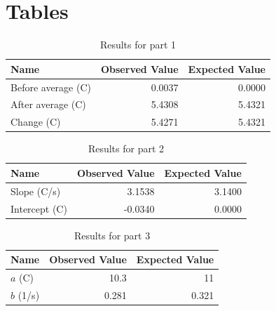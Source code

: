 \section{Tables}
\begin{table}[ht]
    \centering
    \begin{tabular}{|l|r|r|}
        \hline
        Name & Observed Value & Expected Value \\
        \hline
        Before average (C) & 0.0037 & 0.0000 \\
        After average (C) & 5.4308 & 5.4321 \\
        Change (C) & 5.4271 & 5.4321 \\
        \hline
    \end{tabular}
    \caption{Results for part 1}
    \label{table_00_average}
\end{table}
\begin{table}[ht]
    \centering
    \begin{tabular}{|l|r|r|}
        \hline
        Name & Observed Value & Expected Value \\
        \hline
        Slope (C/s) & 3.1538 & 3.1400 \\
        Intercept (C) & -0.0340 & 0.0000 \\
        \hline
    \end{tabular}
    \caption{Results for part 2}
    \label{table_00_linear}
\end{table}
\begin{table}[ht]
    \centering
    \begin{tabular}{|l|r|r|}
        \hline
        Name & Observed Value & Expected Value \\
        \hline
        $a$ (C) & 10.3 & 11 \\
        $b$ (1/s) & 0.281 & 0.321 \\
        \hline
    \end{tabular}
    \caption{Results for part 3}
    \label{table_00_exponential}
\end{table}
\newpage

